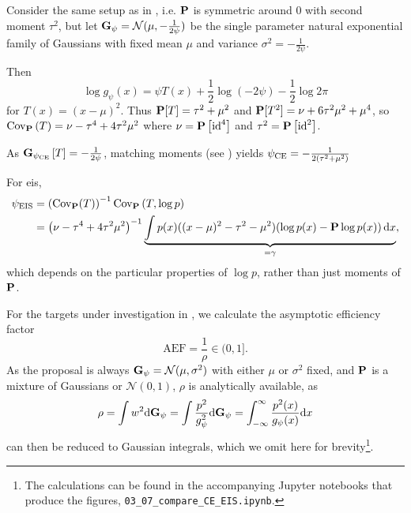 \begin{example}
    \label{ex:univ-gaussian-mu-fixed}
    Consider the same setup as in , i.e. $\P$ is symmetric around $0$ with second moment $\tau^{2}$, but let $\G_{\psi} = \mathcal N(\mu, -\frac{1}{2\psi})$ be the single parameter natural exponential family of Gaussians with fixed mean $\mu$ and variance $\sigma^{2} = -\frac{1}{2 \psi}$. 
    
    Then
    $$
    \log g_{\psi}(x) = \psi T(x) + \frac{1}{2}\log \left( - 2 \psi \right) - \frac{1}{2} \log 2\pi
    $$
    for $T(x) = (x - \mu)^{2}$. Thus $\P [T] = \tau^{2} + \mu^{2}$ and $\P[T^{2}] =\nu + 6\tau^{2}\mu^{2} + \mu^{4}$, so $\cov_{\P} \left(T\right) = \nu - \tau^{4} + 4\tau^{2}\mu^{2}$ where $\nu = \P \left[\operatorname{id}^{4}\right]$ and $\tau^{2} = \P \left[\id^{2}\right]$. 

    As $\G_{\pce} \left[ T \right] = - \frac{1}{2\psi}$, matching moments (see ) yields
    $\pce = -\frac{1}{2(\tau^{2} + \mu^{2})}$

    For \gls{eis},
    \begin{align*}
    \peis &= \left( \cov_{\P} (T) \right)^{-1} \cov_{\P} \left( T, \log p \right) \\
        &= \left( \nu - \tau^{4} + 4\tau^{2}\mu^{2} \right)^{-1} \underbrace{\int p(x)((x-\mu)^{2}-\tau^{2} - \mu^{2})(\log p(x) - \P\log p(x)) \d x}_{=\gamma},
    \end{align*}
    which depends on the particular properties of $\log p$, rather than just moments of $\P$.
\end{example}

For the targets under investigation in , we calculate the asymptotic efficiency factor
$$
\text{AEF} = \frac{1}{\rho} \in (0, 1].
$$
As the proposal is always $\G_{\psi} = \mathcal N(\mu, \sigma^{2})$ with either $\mu$ or $\sigma^{2}$ fixed, and $\P$ is a mixture of Gaussians or $\mathcal N(0,1)$, $\rho$ is analytically available, as 
$$
    \rho = \int w^{2} \mathrm d \mathcal \G_\psi = \int \frac{p^{2}}{g_{\psi}^{2}} \mathrm d \mathcal \G_\psi = \int_{-\infty}^\infty \frac{p^{2}(x)}{g_\psi(x)} \mathrm d x
$$
can then be reduced to Gaussian integrals, which we omit here for brevity\footnote{The calculations can be found in the accompanying Jupyter notebooks that produce the figures, \texttt{03\_07\_compare\_CE\_EIS.ipynb}.}.

